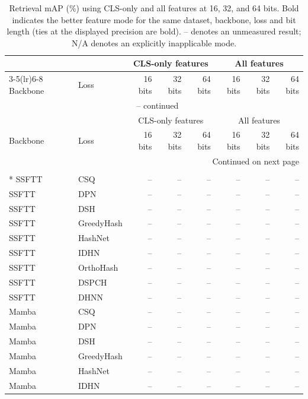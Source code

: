 \small
\setlength{\tabcolsep}{6pt}
\begin{longtable}{llrrrrrr}
\caption{Retrieval mAP (\%) using CLS-only and all features at 16, 32, and 64 bits. Bold indicates the better feature mode for the same dataset, backbone, loss and bit length (ties at the displayed precision are bold). -- denotes an unmeasured result; N/A denotes an explicitly inapplicable mode.}\label{tab:cls-all-hashing}\\
\toprule
 & & \multicolumn{3}{c}{CLS-only features} & \multicolumn{3}{c}{All features}\\
\cmidrule(lr){3-5}\cmidrule(lr){6-8}
Backbone & Loss & 16 bits & 32 bits & 64 bits & 16 bits & 32 bits & 64 bits\\
\midrule
\endfirsthead
\multicolumn{8}{c}{\tablename\ \thetable{} -- continued}\\
\toprule
 & & \multicolumn{3}{c}{CLS-only features} & \multicolumn{3}{c}{All features}\\
Backbone & Loss & 16 bits & 32 bits & 64 bits & 16 bits & 32 bits & 64 bits\\
\midrule
\endhead
\midrule
\multicolumn{8}{r}{Continued on next page}\\
\endfoot
\bottomrule
\endlastfoot
\multicolumn{8}{c}{\textbf{Houston2013}}\\*
\midrule
SSFTT & CSQ & -- & -- & -- & -- & -- & -- \\
SSFTT & DPN & -- & -- & -- & -- & -- & -- \\
SSFTT & DSH & -- & -- & -- & -- & -- & -- \\
SSFTT & GreedyHash & -- & -- & -- & -- & -- & -- \\
SSFTT & HashNet & -- & -- & -- & -- & -- & -- \\
SSFTT & IDHN & -- & -- & -- & -- & -- & -- \\
SSFTT & OrthoHash & -- & -- & -- & -- & -- & -- \\
SSFTT & DSPCH & -- & -- & -- & -- & -- & -- \\
SSFTT & DHNN & -- & -- & -- & -- & -- & -- \\
\addlinespace
Mamba & CSQ & -- & -- & -- & -- & -- & -- \\
Mamba & DPN & -- & -- & -- & -- & -- & -- \\
Mamba & DSH & -- & -- & -- & -- & -- & -- \\
Mamba & GreedyHash & -- & -- & -- & -- & -- & -- \\
Mamba & HashNet & -- & -- & -- & -- & -- & -- \\
Mamba & IDHN & -- & -- & -- & -- & -- & -- \\

\end{longtable}
